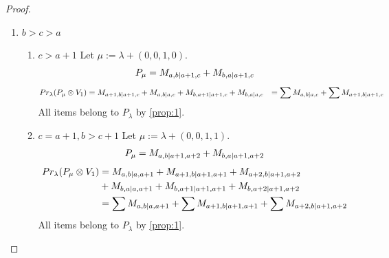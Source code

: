 \documentclass[12pt,a4paper]{article}
\begin{document}
\begin{proof}
\begin{enumerate}
\begin{enumerate}
\item $c=a+1$
        Let $\mu:=\lambda + (0,0,1,1) $. 
\begin{equation}\notag
  \begin{aligned}
      P_{\mu} =
M_{a,b|a+1,a+2}
  \end{aligned}
\end{equation}
\begin{equation}\notag
  \begin{aligned}
  Pr_{\lambda}(P_\mu \otimes V_3) &=
M_{a,b|a,a+1}
+M_{a+1,b|a+1,a+1}
+M_{a+2,b|a+1,a+2}
  \end{aligned}
\end{equation}
All items belong to $P_\lambda$ by \cref{prop:1}.
  \end{enumerate}
  
\item $b>c>a$
  \begin{enumerate}
    \item $c>a+1$
        Let $\mu:=\lambda + (0,0,1,0) $. 
\begin{equation}\notag
  \begin{aligned}
      P_{\mu} =M_{a,b|a+1,c}
+M_{b,a|a+1,c}
  \end{aligned}
\end{equation}
\begin{equation}\notag
  \begin{aligned}
  Pr_{\lambda}(P_\mu \otimes V_1) &=
M_{a+1,b|a+1,c}
+M_{a,b|a,c}
+M_{b,a+1|a+1,c}
+M_{b,a|a,c}
                                  &=
\sum M_{a,b|a,c}
+\sum M_{a+1,b|a+1,c}
  \end{aligned}
\end{equation}
All items belong to $P_\lambda$ by \cref{prop:1}.

  \item $c=a+1,b>c+1$
   Let $\mu:=\lambda + (0,0,1,1) $. 
\begin{equation}\notag
  \begin{aligned}
      P_{\mu} =
M_{a,b|a+1,a+2}
+M_{b,a|a+1,a+2}
  \end{aligned}
\end{equation}
\begin{equation}\notag
  \begin{aligned}
  Pr_{\lambda}(P_\mu \otimes V_1) &=
M_{a,b|a,a+1}
+M_{a+1,b|a+1,a+1}
+M_{a+2,b|a+1,a+2} \\
                                  &+
M_{b,a|a,a+1}
+M_{b,a+1|a+1,a+1}
+M_{b,a+2|a+1,a+2}\\
                                  &=
\sum M_{a,b|a,a+1}
+\sum M_{a+1,b|a+1,a+1}
+\sum M_{a+2,b|a+1,a+2}
  \end{aligned}
\end{equation}
All items belong to $P_\lambda$ by \cref{prop:1}.


\end{enumerate}
\end{enumerate}
\end{proof}
\end{document}
